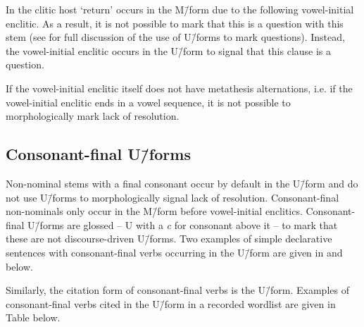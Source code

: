 In  the clitic host  `return'
occurs in the M\=/form due to the following vowel-initial enclitic.
As a result, it is not possible to mark
that this is a question with this stem
(see  for full discussion of
the use of U\=/forms to mark questions).
Instead, the vowel-initial enclitic occurs in the U\=/form
to signal that this clause is a question.

If the vowel-initial enclitic itself does not have metathesis
alternations, i.e. if the vowel-initial enclitic ends in a vowel sequence,
it is not possible to morphologically mark lack of resolution.

\subsection{Consonant-final U\=/forms}\label{sec:ConFinVer}
Non-nominal stems with a final consonant occur by default in the U\=/form
and do not use U\=/forms to morphologically signal lack of resolution.
Consonant-final non-nominals only occur in the M\=/form
before vowel-initial enclitics.
Consonant-final U\=/forms are glossed {\Uc}
-- U with a \emph{c} for consonant above it --
to mark that these are not discourse-driven U\=/forms.
Two examples of simple declarative sentences with
consonant-final verbs occurring in the U\=/form
are given in  and  below.

\begin{exe}
	\label{ex2:120715-4, 0.05}
	\label{ex:130823-2, 0.57}
\end{exe}

Similarly, the citation form of consonant-final verbs is the U\=/form.
Examples of consonant-final verbs cited in the U\=/form in a recorded wordlist
are given in Table  below.

